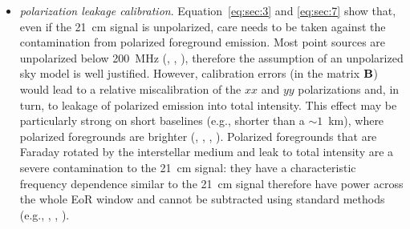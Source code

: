 \begin{itemize}
\item {\it polarization leakage calibration}. Equation~\ref{eq:sec:3} and \ref{eq:sec:7} show that, even if the 21~cm signal is unpolarized, care needs to be taken against the contamination from polarized foreground emission. Most point sources are unpolarized below 200~MHz (\cite{bernardi13}, \cite{lenc16}, \cite{vaneck18}), therefore the assumption of an unpolarized sky model is well justified. However, calibration errors (in the matrix ${\bf B}$) would lead  to a relative miscalibration of the $xx$ and $yy$ polarizations and, in turn, to leakage of polarized emission into total intensity. This effect may be particularly strong on short baselines (e.g., shorter than a $\sim 1$~km), where polarized foregrounds are brighter (\cite{bernardi09}, \cite{iacobelli13}, \cite{jelic15}, \cite{lenc16}). Polarized foregrounds that are Faraday rotated by the interstellar medium and leak to total intensity are a severe contamination to the 21~cm signal: they have a characteristic frequency dependence similar to the 21~cm signal therefore have power across the whole EoR window and cannot be subtracted using standard methods (e.g., \cite{jelic10}, \cite{moore13}, \cite{nunhokee17}).  


\end{itemize}

